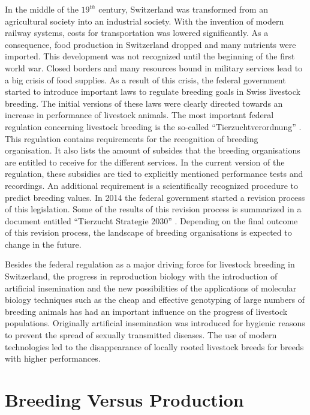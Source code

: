 \documentclass[
]{book}
\begin{document}
In the middle of the \(19^{th}\) century, Switzerland was transformed from an agricultural society into an industrial society. With the invention of modern railway systems, costs for transportation was lowered significantly. As a consequence, food production in Switzerland dropped and many nutrients were imported. This development was not recognized until the beginning of the first world war. Closed borders and many resources bound in military services lead to a big crisis of food supplies. As a result of this crisis, the federal government started to introduce important laws to regulate breeding goals in Swiss livestock breeding. The initial versions of these laws were clearly directed towards an increase in performance of livestock animals. The most important federal regulation concerning livestock breeding is the so-called ``Tierzuchtverordnung'' \citep{Bundesrat2012}. This regulation contains requirements for the recognition of breeding organisation. It also lists the amount of subsides that the breeding organisations are entitled to receive for the different services. In the current version of the regulation, these subsidies are tied to explicitly mentioned performance tests and recordings. An additional requirement is a scientifically recognized procedure to predict breeding values. In 2014 the federal government started a revision process of this legislation. Some of the results of this revision process is summarized in a document entitled ``Tierzucht Strategie 2030'' \citep{Lehmann2018}. Depending on the final outcome of this revision process, the landscape of breeding organisations is expected to change in the future.

Besides the federal regulation as a major driving force for livestock breeding in Switzerland, the progress in reproduction biology with the introduction of artificial insemination and the new possibilities of the applications of molecular biology techniques such as the cheap and effective genotyping of large numbers of breeding animals has had an important influence on the progress of livestock populations. Originally artificial insemination was introduced for hygienic reasons to prevent the spread of sexually transmitted diseases. The use of modern technologies led to the disappearance of locally rooted livestock breeds for breeds with higher performances.

\hypertarget{gel-intro-breedingvsproduction}{%
\section{Breeding Versus Production}\label{gel-intro-breedingvsproduction}}
\end{document}

